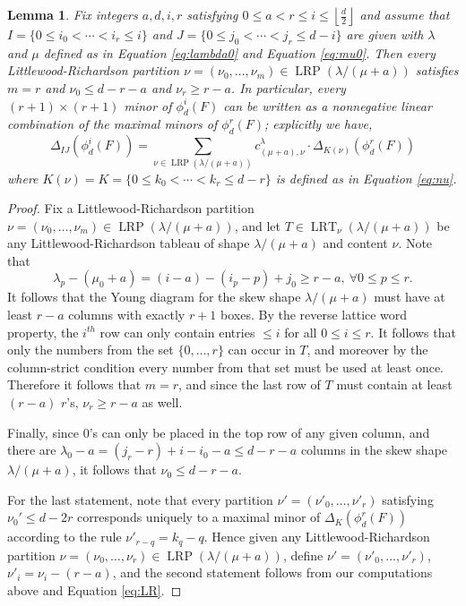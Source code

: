 \documentclass[unnumsec,webpdf,modern,medium]{oup-authoring-template}
\newcommand{\flo}[1]{\left\lfloor\frac{#1}{2}\right\rfloor}
\theoremstyle{theorem}
\newtheorem{lemma}[theorem]{Lemma}
\theoremstyle{definition}
\begin{document}
\begin{lemma}
	\label{lem:LRr}
	Fix integers $a,d,i,r$ satisfying $0\leq a<r\leq i\leq \flo{d}$ and assume that $I=\{0\leq i_0<\cdots<i_r\leq i\}$ and $J=\{0\leq j_0<\cdots<j_r\leq d-i\}$ are given with $\lambda$ and $\mu$ defined as in Equation \eqref{eq:lambda0} and Equation \eqref{eq:mu0}.  Then every Littlewood-Richardson partition $\nu=(\nu_0,\ldots,\nu_m)\in\operatorname{LRP}(\lambda/(\mu+a))$ satisfies
	$m=r$ and $\nu_0\leq d-r-a$ and $\nu_r\geq r-a$.  In particular, every $(r+1)\times (r+1)$ minor of $\phi^i_d(F)$ can be written as a nonnegative linear combination of the maximal minors of $\phi^r_d(F)$; explicitly we have,
	\begin{equation}
		\label{eq:DeltaLR}
		\Delta_{IJ}\left(\phi^i_d(F)\right)=\sum_{\nu\in\operatorname{LRP}(\lambda/(\mu+a))}c^{\lambda}_{(\mu+a),\nu}\cdot\Delta_{K(\nu)}\left(\phi^r_d(F)\right)
	\end{equation}
	where $K(\nu)=K=\{0\leq k_0<\cdots<k_r\leq d-r\}$ is defined as in Equation \eqref{eq:nu}.	
\end{lemma}
\begin{proof}
	Fix a Littlewood-Richardson partition $\nu=(\nu_0,\ldots,\nu_m)\in\operatorname{LRP}(\lambda/(\mu+a))$, and let $T\in\operatorname{LRT}_\nu\left(\lambda/(\mu+a)\right)$ be any Littlewood-Richardson tableau of shape $\lambda/(\mu+a)$ and content $\nu$.
	Note that $$\lambda_p-(\mu_0+a)=(i-a)-(i_p-p)+j_0\geq r-a, \ \forall 0\leq p\leq r.$$
	It follows that the Young diagram for the skew shape $\lambda/(\mu+a)$ must have at least $r-a$ columns with exactly $r+1$ boxes.    
	By the reverse lattice word property, the $i^{th}$ row can only contain entries $\leq i$ for all $0\leq i\leq r$.  It follows that only the numbers  from the set $\{0,\ldots,r\}$ can occur in $T$, and moreover by the column-strict condition every number from that set must be used at least once.  Therefore it follows that $m=r$, and since the last row of $T$ must contain at least $(r-a)$ $r$'s, $\nu_r\geq r-a$ as well. 
	
	Finally, since $0$'s can only be placed in the top row of any given column, and there are $\lambda_0-a=(j_r-r)+i-i_0-a\leq d-r-a$ columns in the skew shape $\lambda/(\mu+a)$, it follows that $\nu_0\leq d-r-a$.
	
	For the last statement, note that every partition $\nu'=(\nu'_0,\ldots,\nu'_r)$ satisfying $\nu_0'\leq d-2r$ corresponds uniquely to a maximal minor of $\Delta_K\left(\phi^r_d(F)\right)$ according to the rule $\nu'_{r-q}=k_q-q$.  Hence given any Littlewood-Richardson partition $\nu=(\nu_0,\ldots,\nu_r)\in\operatorname{LRP}(\lambda/(\mu+a))$, define $\nu'=(\nu'_0,\ldots,\nu'_r)$, $\nu'_i=\nu_i-(r-a)$, and the second statement follows from our computations above and Equation \eqref{eq:LR}. 
\end{proof}
\end{document}
